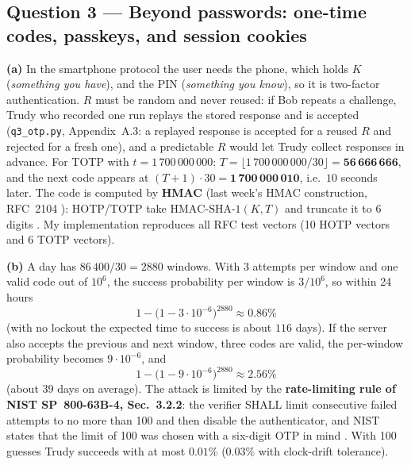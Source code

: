 \documentclass[11pt,a4paper]{article}
\begin{document}
\subsection*{Question 3 --- Beyond passwords: one-time codes, passkeys, and session cookies}
\textbf{(a)} In the smartphone protocol the user needs the phone, which holds $K$ (\emph{something you have}),
and the PIN (\emph{something you know}), so it is two-factor authentication. $R$ must be random and never
reused: if Bob repeats a challenge, Trudy who recorded one run replays the stored response and is accepted
(\texttt{q3\_otp.py}, Appendix~A.3: a replayed response is accepted for a reused $R$ and rejected for a fresh one),
and a predictable $R$ would let Trudy collect responses in advance.
For TOTP with $t=1\,700\,000\,000$:
$T=\lfloor 1\,700\,000\,000/30\rfloor=\mathbf{56\,666\,666}$, and the next code appears at
$(T+1)\cdot 30=\mathbf{1\,700\,000\,010}$, i.e.\ $10$ seconds later. The code is computed by \textbf{HMAC}
(last week's HMAC construction, RFC~2104 \cite{rfc2104}): HOTP/TOTP take
$\mathrm{HMAC\text{-}SHA\text{-}1}(K,T)$ and truncate it to 6 digits \cite{rfc4226,rfc6238}. My implementation
reproduces all RFC test vectors (10 HOTP vectors and 6 TOTP vectors).

\textbf{(b)} A day has $86\,400/30=2880$ windows. With 3 attempts per window and one valid code out of $10^{6}$,
the success probability per window is $3/10^{6}$, so within 24 hours
\[
1-\bigl(1-3\cdot10^{-6}\bigr)^{2880}\approx \mathbf{0.86\%}
\]
(with no lockout the expected time to success is about $116$ days). If the server also accepts the previous
and next window, three codes are valid, the per-window probability becomes $9\cdot10^{-6}$, and
\[
1-\bigl(1-9\cdot10^{-6}\bigr)^{2880}\approx \mathbf{2.56\%}
\]
(about $39$ days on average). The attack is limited by the \textbf{rate-limiting rule of NIST SP~800-63B-4,
Sec.~3.2.2}: the verifier SHALL limit consecutive failed attempts to no more than 100 and then disable the
authenticator, and NIST states that the limit of 100 was chosen with a six-digit OTP in mind \cite{nist63b4}.
With 100 guesses Trudy succeeds with at most $0.01\%$ ($0.03\%$ with clock-drift tolerance).
\end{document}
